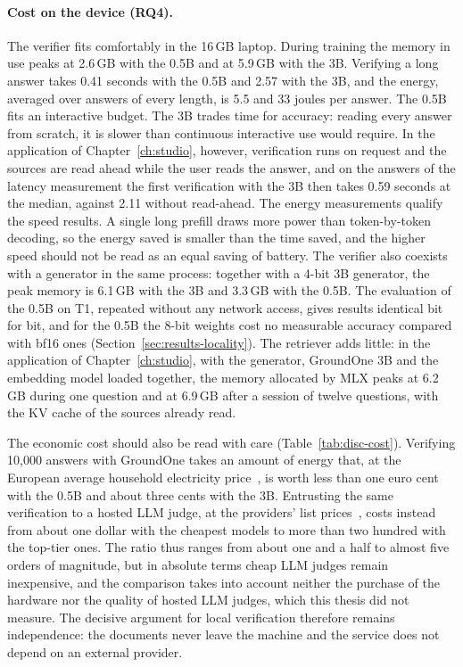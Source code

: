 \paragraph{Cost on the device (RQ4).} The verifier fits comfortably in the 16\,GB laptop. During training the memory in
use peaks at 2.6\,GB with the 0.5B and at 5.9\,GB with the 3B. Verifying a long answer takes 0.41 seconds with the 0.5B and 2.57 with the 3B, and the energy, averaged over answers of every length, is 5.5 and 33 joules per answer. The 0.5B fits an interactive budget. The 3B trades time for accuracy: reading every answer from scratch, it is slower than continuous interactive use would require. In the application of Chapter~\ref{ch:studio}, however, verification runs on request and the sources are read ahead while the user reads the answer, and on the answers of the latency measurement the first verification with the 3B then takes 0.59 seconds at the median, against 2.11 without read-ahead. The energy measurements qualify the speed
results. A single long prefill draws more power than token-by-token decoding, so the energy saved is smaller than the
time saved, and the higher speed should not be read as an equal saving of battery. The verifier also coexists with a
generator in the same process: together with a 4-bit 3B generator, the peak memory is 6.1\,GB with the 3B and 3.3\,GB
with the 0.5B. The evaluation of the 0.5B on T1, repeated without any network access, gives results identical bit for bit, and for the 0.5B the 8-bit weights cost no measurable accuracy compared with bf16 ones (Section~\ref{sec:results-locality}). The retriever adds little: in the
application of Chapter~\ref{ch:studio}, with the generator, GroundOne 3B and the embedding model loaded together, the
memory allocated by MLX peaks at 6.2\,GB during one question and at 6.9\,GB after a session of twelve questions, with the KV cache of the sources already read.

The economic cost should also be read with care (Table~\ref{tab:disc-cost}). Verifying 10{,}000 answers with GroundOne
takes an amount of energy that, at the European average household electricity price~\cite{eurostat2026electricity}, is
worth less than one euro cent with the 0.5B and about three cents with the 3B. Entrusting the same verification to a
hosted LLM judge, at the providers' list prices~\cite{anthropic2026pricing,openai2026pricing,google2026geminipricing}, costs
instead from about one dollar with the cheapest models to more than two hundred with the top-tier ones. The ratio thus ranges from about one and a half to almost five orders of magnitude, but in absolute terms cheap LLM judges remain inexpensive, and the comparison takes into
account neither the purchase of the hardware nor the quality of hosted LLM judges, which this thesis did not measure. The
decisive argument for local verification therefore remains independence: the documents never leave the machine and the
service does not depend on an external provider.

